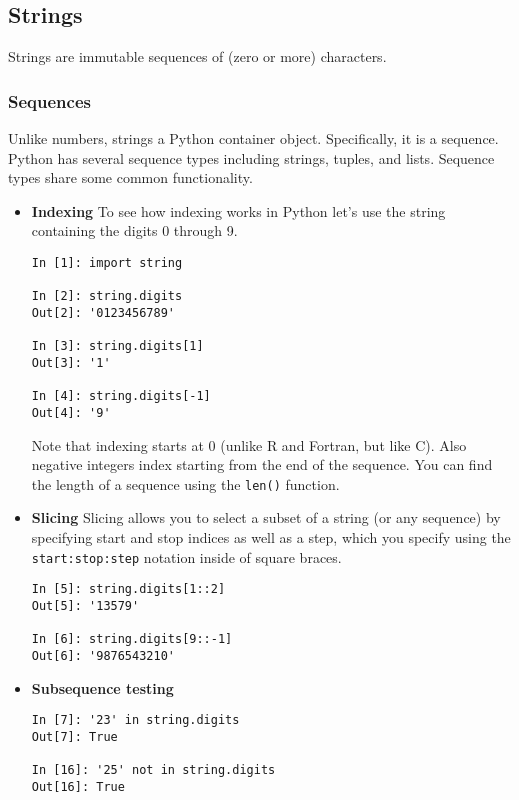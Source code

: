 \subsection{Strings}

Strings are immutable sequences of (zero or more) characters.

\subsubsection{Sequences}
Unlike numbers, strings a Python container object.  Specifically, it is a
sequence.  Python has several sequence types including strings, tuples, and
lists.  Sequence types share some common functionality.

\begin{itemize}

\item \textbf{Indexing}
To see how indexing works in Python let's use the string containing the digits
0 through 9.
\begin{verbatim}
In [1]: import string

In [2]: string.digits
Out[2]: '0123456789'

In [3]: string.digits[1]
Out[3]: '1'

In [4]: string.digits[-1]
Out[4]: '9'
\end{verbatim}
Note that indexing starts at 0 (unlike R and Fortran, but like C).  Also negative
integers index starting from the end of the sequence. You can find the length of
a sequence using the \texttt{len()} function.

\item \textbf{Slicing}
Slicing allows you to select a subset of a string (or any sequence) by specifying
start and stop indices as well as a step, which you specify using the
\texttt{start:stop:step} notation inside of square braces.
\begin{verbatim}
In [5]: string.digits[1::2]
Out[5]: '13579'

In [6]: string.digits[9::-1]
Out[6]: '9876543210'
\end{verbatim}

\item \textbf{Subsequence testing}
\begin{verbatim}
In [7]: '23' in string.digits
Out[7]: True

In [16]: '25' not in string.digits
Out[16]: True
\end{verbatim}
\end{itemize}

